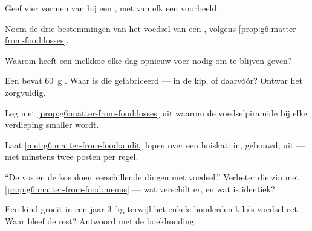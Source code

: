 \begin{exercise}[$\star$]\label{exo:g6:matter-from-food:3}
Geef vier vormen van  bij een , met van elk een
voorbeeld.
\end{exercise}

\begin{exercise}[$\star$]\label{exo:g6:matter-from-food:4}
Noem de drie bestemmingen van het voedsel van een , volgens
\cref{prop:g6:matter-from-food:losses}.
\end{exercise}

\begin{exercise}[$\star$]\label{exo:g6:matter-from-food:5}
Waarom heeft een melkkoe elke dag opnieuw voer nodig om  te blijven
geven?
\end{exercise}

\begin{exercise}[$\star$]\label{exo:g6:matter-from-food:6}
Een  bevat \qty{60}{g} . Waar is die gefabriceerd ---
in de kip, of daarvóór? Ontwar het zorgvuldig.
\end{exercise}

\begin{exercise}[$\star\star$]\label{exo:g6:matter-from-food:7}
Leg met \cref{prop:g6:matter-from-food:losses} uit waarom de
voedselpiramide bij elke verdieping smaller wordt.
\end{exercise}

\begin{exercise}[$\star\star$]\label{exo:g6:matter-from-food:8}
Laat \cref{met:g6:matter-from-food:audit} lopen over een huiskat: in,
gebouwd, uit --- met minstens twee posten per regel.
\end{exercise}

\begin{exercise}[$\star\star$]\label{exo:g6:matter-from-food:9}
``De vos en de koe doen verschillende dingen met voedsel.'' Verbeter die
zin met \cref{prop:g6:matter-from-food:menus} --- wat verschilt er, en
wat is identiek?
\end{exercise}

\begin{exercise}[$\star\star$]\label{exo:g6:matter-from-food:10}
Een kind groeit in een jaar \qty{3}{kg} terwijl het enkele honderden
kilo's voedsel eet. Waar bleef de rest? Antwoord met de boekhouding.
\end{exercise}

